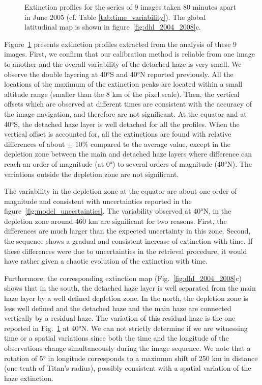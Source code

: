\begin{figure}[!ht]
\caption{Extinction profiles for the series
of 9 images taken 80 minutes apart in June 2005 (cf. Table \ref{tab:time_variability}).
The global latitudinal map is shown in figure~\ref{fig:dhl_2004_2008}c.}
\label{fig:time_variability}
\end{figure}

Figure~\ref{fig:time_variability} presents extinction profiles extracted from the analysis of these 9 images.
First, we confirm that our calibration method is reliable from one image to another and the overall
variability of the detached haze is very small. We observe the double layering at \ang{40}S and \ang{40}N reported
previously. All the locations of the maximum of the extinction peaks are located within a small altitude range (smaller
than the 8 km of the pixel scale). Then, the vertical offsets which are observed at different times are consistent
with  the accuracy of the image navigation, and therefore are not significant. At the equator and at \ang{40}S, the detached
haze layer is well detached for all the profiles. When the vertical offset is accounted for, all the extinctions are found
with relative differences of about $\pm$ 10\% compared to the average value, except in the depletion zone between
the main and detached haze layers where difference can reach an order of magnitude (at \ang{0}) to several orders of magnitude
(\ang{40}N). The variations outside the depletion zone are not significant.

The variability in the depletion zone at the equator are about one order of magnitude and
consistent with uncertainties reported in the figure~\ref{fig:model_uncertainties}.
The variability observed at \ang{40}N, in the depletion zone around 460 km are significant for two reasons.
First, the differences are much larger than the expected uncertainty in this zone. Second, the sequence shows
a gradual and consistent increase of extinction with time. If these differences were due to uncertainties in
the retrieval procedure, it would have rather given a chaotic evolution of the extinction with time.

Furthermore, the corresponding extinction map (Fig.~\ref{fig:dhl_2004_2008}c) shows that in the south,
the detached haze layer is well separated from the main haze layer by a well defined depletion zone. In the north, the depletion
zone is less well defined and the detached haze and the main haze are connected vertically by a residual haze.
The variation of this residual haze is the one reported in Fig.~\ref{fig:time_variability} at \ang{40}N.
We can not strictly determine if we are witnessing time or a spatial variations since both the time and the longitude
of the observations change simultaneously during the image sequence. We note that a rotation of \ang{5} in longitude
corresponds to a maximum shift of 250 km in distance (one tenth of Titan's radius), possibly consistent with a spatial
variation of the haze extinction.
